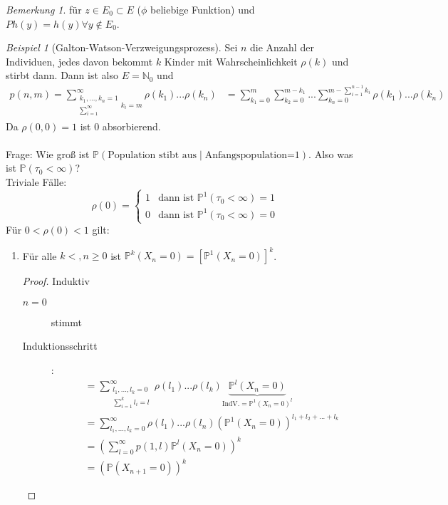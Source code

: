 \documentclass[10pt,a4paper]{article}
\newcommand{\N}{\ensuremath{\mathbb{N}}}
\newcommand{\Prb}{\mathbb P}
\theoremstyle{plain}
\theoremstyle{definition}
\theoremstyle{remark}
\newtheorem{bem}[theorem]{Bemerkung}
\newtheorem{exm}[theorem]{Beispiel}
\begin{document}
	\begin{bem}
		für $z\in E_0\subset E$ ($\phi$ beliebige Funktion) und $Ph(y)=h(y)\forall y\notin E_0$. 
	\end{bem}
	
	\begin{exm}[Galton-Watson-Verzweigungsprozess]
		Sei $n$ die Anzahl der Individuen, jedes davon bekommt $k$ Kinder mit Wahrscheinlichkeit $\rho(k)$ und stirbt dann.
		Dann ist also $E=\N_0$ und
		\begin{align*}
		p(n,m)=\sum_{\substack{k_1,...,k_n=1\\\sum_{i=1}^\infty}k_i=m}^{\infty}\rho(k_1)...\rho(k_n)&=\sum_{k_1=0}^{m}\sum_{k_2=0}^{m-k_1}...\sum_{k_n=0}^{m-\sum_{i=1}^{n-1}k_i}\rho(k_1)...\rho(k_n)
		\end{align*}
		Da $\rho(0,0)=1$ ist $0$ absorbierend.\\
		\\
		Frage: Wie groß ist $\Prb(\text{Population stibt aus}\mid\text{Anfangspopulation=1})$. Also was ist $\Prb(\tau_0<\infty)$?\\
		Triviale Fälle:
		\[\rho(0)=\begin{cases}
		1&\text{dann ist }\Prb^1(\tau_0<\infty)=1\\
		0&\text{dann ist }\Prb^1(\tau_0<\infty)=0
		\end{cases}\]
		Für $0<\rho(0)<1$ gilt:
		\begin{enumerate}
			\item Für alle $k<,n\geq 0$ ist $\Prb^k(X_n=0)=\left[\Prb^1(X_n=0)\right]^k$.
			\begin{proof}Induktiv
				\begin{description}
					\item[$n=0$] stimmt
					\item[Induktionsschritt]:
					\begin{align*}
					&=\sum_{\substack{l_1,...,l_k=0\\\sum_{i=1}^{k}l_i=l}}^{\infty}\rho(l_1)...\rho(l_k)\underbrace{\Prb^l(X_n=0)}_{\text{IndV.}=\Prb^1(X_n=0)^l}\\
					&=\sum_{l_1,...,l_k=0}^{\infty}\rho(l_1)...\rho(l_n)\left(\Prb^1(X_n=0)\right)^{l_1+l_2+...+l_k}\\
					&=\left(\sum_{l=0}^{\infty}p(1,l)\Prb^l(X_n=0)\right)^k\\
					&=\left(\Prb(X_{n+1}=0)\right)^k
					\end{align*}
				\end{description}
			\end{proof}

\end{enumerate}
\end{exm}
\end{document}
